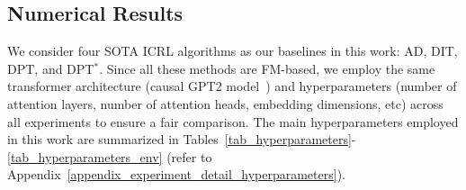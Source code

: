 













\subsection{Numerical Results}

We consider four SOTA ICRL algorithms as our baselines in this work: AD, DIT, DPT, and DPT$^*$.
%
Since all these methods are FM-based, we employ the same transformer architecture (causal GPT2 model~\citep{radford2019language}) and hyperparameters (number of attention layers, number of attention heads, embedding dimensions, etc) across all experiments to ensure a fair comparison. The main hyperparameters employed in this work are summarized in Tables~\ref{tab_hyperparameters}-\ref{tab_hyperparameters_env} (refer to Appendix~\ref{appendix_experiment_detail_hyperparameters}).
%

